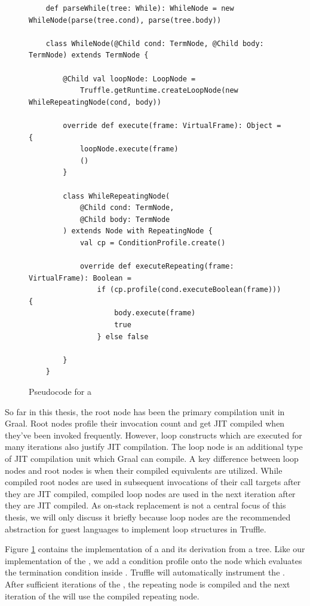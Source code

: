 \begin{figure}[!htb]
	\begin{verbatim}
	def parseWhile(tree: While): WhileNode = new WhileNode(parse(tree.cond), parse(tree.body))	
		
	class WhileNode(@Child cond: TermNode, @Child body: TermNode) extends TermNode {
		
		@Child val loopNode: LoopNode = 
			Truffle.getRuntime.createLoopNode(new WhileRepeatingNode(cond, body))
		
		override def execute(frame: VirtualFrame): Object = {
			loopNode.execute(frame)
			()
		}
		
		class WhileRepeatingNode(
			@Child cond: TermNode, 
			@Child body: TermNode
		) extends Node with RepeatingNode {
			val cp = ConditionProfile.create()
			
			override def executeRepeating(frame: VirtualFrame): Boolean = 
				if (cp.profile(cond.executeBoolean(frame))) {
					body.execute(frame)
					true 
				} else false 
				
		}
	}
	\end{verbatim}
	\caption{Pseudocode for a }
	\label{impl:while}
\end{figure}

So far in this thesis, the root node has been the primary compilation unit in Graal.
Root nodes profile their invocation count and get JIT compiled when they've been invoked frequently.
However, loop constructs which are executed for many iterations also justify JIT compilation.
The loop node is an additional type of JIT compilation unit which Graal can compile.
A key difference between loop nodes and root nodes is when their compiled equivalents are utilized.
While compiled root nodes are used in subsequent invocations of their call targets after they are JIT compiled, compiled loop nodes are used in the next iteration after they are JIT compiled.
As on-stack replacement is not a central focus of this thesis, we will only discuss it briefly because loop nodes are the recommended abstraction for guest languages to implement loop structures in Truffle.

Figure \ref{impl:while} contains the implementation of a  and its derivation from a  tree.
Like our implementation of the , we add a condition profile onto the node which evaluates the termination condition inside .
Truffle will automatically instrument the .
After sufficient iterations of the , the repeating node is compiled and the next iteration of the  will use the compiled repeating node.

